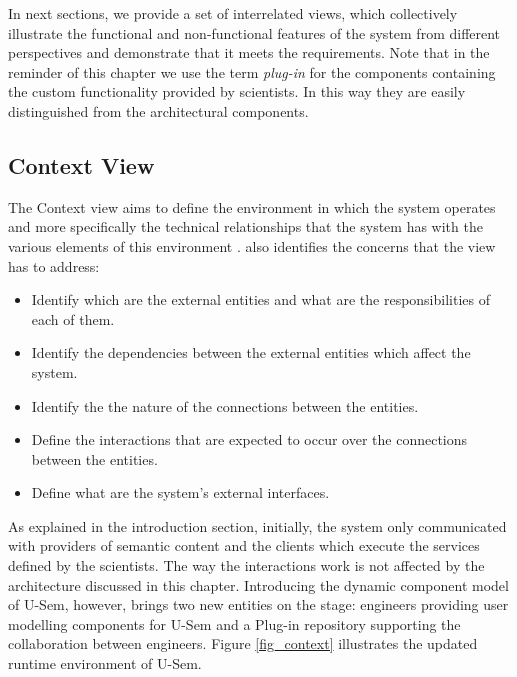 In next sections, we provide a set of interrelated views, which collectively illustrate the functional and non-functional features of the system from different perspectives and demonstrate that it meets the requirements. Note that in the reminder of this chapter we use the term \textit{plug-in} for the components containing the custom functionality provided by scientists. In this way they are easily distinguished from the architectural components. 

\subsection{Context View}

The Context view aims to define the environment in which the system operates and more specifically the technical relationships that the system has with the various elements of this environment \cite{woods2009system}. \cite{woods2009system} also identifies the concerns that the view has to address:

\begin{itemize}
	\item Identify which are the external entities and what are the responsibilities of each of them.
	\item Identify the dependencies between the external entities which affect the system.
	\item Identify the the nature of the connections between the entities.
	\item Define the interactions that are expected to occur over the connections between the entities.
	\item Define what are the system's external interfaces.
\end{itemize}


As explained in the introduction section, initially, the system only communicated with providers of semantic content and the clients which execute the services defined by the scientists. The way the interactions work is not affected by the architecture discussed in this chapter. Introducing the dynamic component model of U-Sem, however, brings two new entities on the stage: engineers providing user modelling components for U-Sem and a Plug-in repository supporting the collaboration between engineers. Figure \ref{fig_context} illustrates the updated runtime environment of U-Sem.


